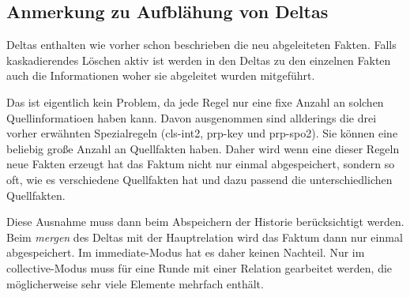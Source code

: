 \subsection{Anmerkung zu Aufblähung von Deltas}
\label{abschnitt-aufblaehung}
Deltas enthalten wie vorher schon beschrieben die neu abgeleiteten Fakten. Falls kaskadierendes Löschen aktiv ist werden in den Deltas zu den einzelnen Fakten auch die Informationen woher sie abgeleitet wurden mitgeführt.

Das ist eigentlich kein Problem, da jede Regel nur eine fixe Anzahl an solchen Quellinformatioen haben kann. Davon ausgenommen sind allderings die drei vorher erwähnten Spezialregeln (cls-int2, prp-key und prp-spo2). Sie können eine beliebig große Anzahl an Quellfakten haben. Daher wird wenn eine dieser Regeln neue Fakten erzeugt hat das Faktum nicht nur einmal abgespeichert, sondern so oft, wie es verschiedene Quellfakten hat und dazu passend die unterschiedlichen Quellfakten.

Diese Ausnahme muss dann beim Abspeichern der Historie berücksichtigt werden. Beim \emph{mergen} des Deltas mit der Hauptrelation wird das Faktum dann nur einmal abgespeichert. Im immediate-Modus hat es daher keinen Nachteil. Nur im collective-Modus muss für eine Runde mit einer Relation gearbeitet werden, die möglicherweise sehr viele Elemente mehrfach enthält.